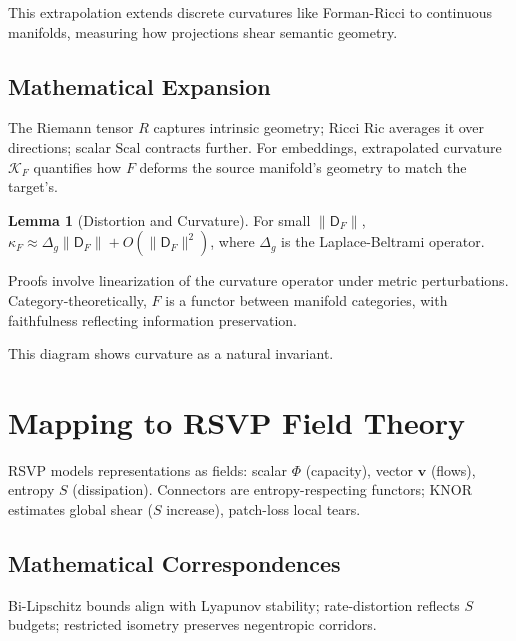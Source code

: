 \documentclass{article}
\theoremstyle{definition}
\newtheorem{lemma}[theorem]{Lemma}
\begin{document}
This extrapolation extends discrete curvatures like Forman-Ricci \cite{forman2003bochner} to continuous manifolds, measuring how projections shear semantic geometry.

\subsection{Mathematical Expansion}

The Riemann tensor $R$ captures intrinsic geometry; Ricci $\mathrm{Ric}$ averages it over directions; scalar $\mathrm{Scal}$ contracts further. For embeddings, extrapolated curvature $\mathcal{K}_F$ quantifies how $F$ deforms the source manifold's geometry to match the target's.

\begin{lemma}[Distortion and Curvature]
For small $\|\mathsf{D}_F\|$, $\kappa_F \approx \Delta_g \|\mathsf{D}_F\| + O(\|\mathsf{D}_F\|^2)$, where $\Delta_g$ is the Laplace-Beltrami operator.
\end{lemma}

Proofs involve linearization of the curvature operator under metric perturbations. Category-theoretically, $F$ is a functor between manifold categories, with faithfulness reflecting information preservation.


This diagram shows curvature as a natural invariant.

\section{Mapping to RSVP Field Theory}

RSVP models representations as fields: scalar $\Phi$ (capacity), vector $\mathbf{v}$ (flows), entropy $S$ (dissipation). Connectors are entropy-respecting functors; KNOR estimates global shear ($S$ increase), patch-loss local tears.

\subsection{Mathematical Correspondences}

Bi-Lipschitz bounds align with Lyapunov stability; rate-distortion reflects $S$ budgets; restricted isometry preserves negentropic corridors.
\end{document}
